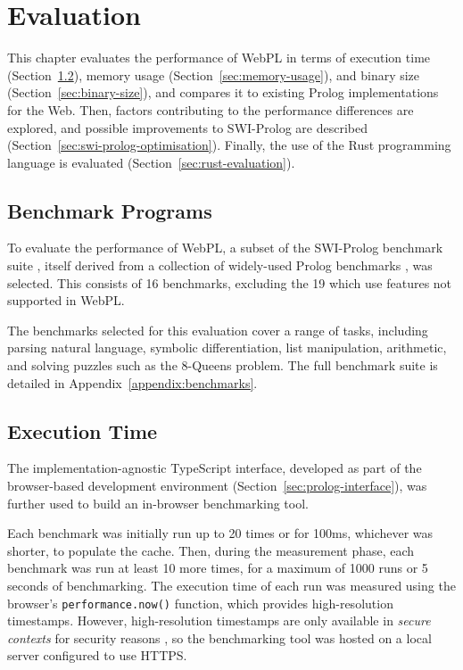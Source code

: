 
\chapter{Evaluation}

This chapter evaluates the performance of WebPL in terms of execution time (Section~\ref{sec:execution-time}), memory usage (Section~\ref{sec:memory-usage}), and binary size (Section~\ref{sec:binary-size}), and compares it to existing Prolog implementations for the Web. Then, factors contributing to the performance differences are explored, and possible improvements to SWI-Prolog are described (Section~\ref{sec:swi-prolog-optimisation}). Finally, the use of the Rust programming language is evaluated (Section~\ref{sec:rust-evaluation}).

\section{Benchmark Programs}

To evaluate the performance of WebPL, a subset of the SWI-Prolog benchmark suite \cite{wielemakerSWIPrologbenchmarksuite2010}, itself derived from a collection of widely-used Prolog benchmarks \cite{haygoodPrologBenchmarkSuite1989}, was selected. This consists of 16 benchmarks, excluding the 19 which use features not supported in WebPL.

The benchmarks selected for this evaluation cover a range of tasks, including parsing natural language, symbolic differentiation, list manipulation, arithmetic, and solving puzzles such as the 8-Queens problem. The full benchmark suite is detailed in Appendix~\ref{appendix:benchmarks}.

\section{Execution Time}

\label{sec:execution-time}

The implementation-agnostic TypeScript interface, developed as part of the browser-based development environment (Section~\ref{sec:prolog-interface}), was further used to build an in-browser benchmarking tool.

Each benchmark was initially run up to 20 times or for 100ms, whichever was shorter, to populate the cache. Then, during the measurement phase, each benchmark was run at least 10 more times, for a maximum of 1000 runs or 5 seconds of benchmarking. The execution time of each run was measured using the browser's \texttt{performance.now()} function, which provides high-resolution timestamps. However, high-resolution timestamps are only available in \emph{secure contexts} for security reasons \cite{sanchez-rolaClockClockTimeBased2018}, so the benchmarking tool was hosted on a local server configured to use HTTPS.


